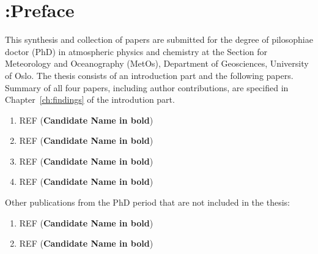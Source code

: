 \chapter*{{\color{red} :}Preface}
%
%
This synthesis and collection of papers are submitted for the degree of pilosophiae doctor (PhD) in atmospheric physics and chemistry at the Section for Meteorology and Oceanography (MetOs), Department of Geosciences, University of Oslo. The thesis consists of an introduction part and the following papers. Summary of all four papers, including author contributions, are specified in Chapter~\ref{ch:findings} of the introdution part.\\




\begin{enumerate}[label={\textbf{Paper~\Roman*:}},leftmargin=*,align=parleft]
\item  REF (\textbf{Candidate Name in bold})

\item REF (\textbf{Candidate Name in bold})

\item  REF (\textbf{Candidate Name in bold})

\item REF (\textbf{Candidate Name in bold})
\end{enumerate}




\vskip1.0cm
Other publications from the PhD period that are not included in the thesis:
\smallskip

%
\begin{enumerate}[label={\textbf{\Roman*}},leftmargin=*,align=parleft]

\item  REF (\textbf{Candidate Name in bold})
\smallskip


\item REF (\textbf{Candidate Name in bold})
\smallskip

\end{enumerate}
